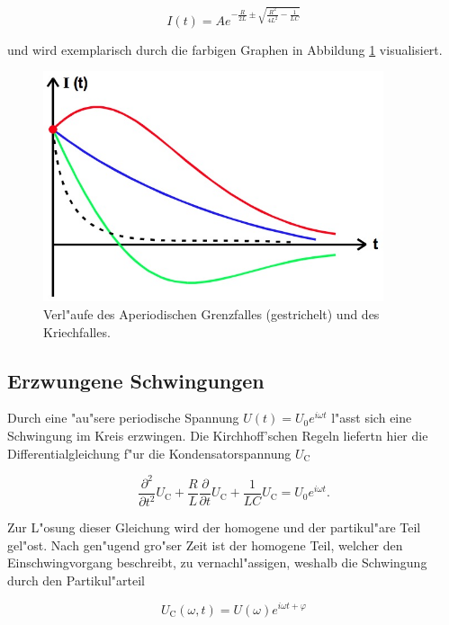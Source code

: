 		\begin{equation*}
			I(t) = Ae^{-\frac{R}{2L} \pm \sqrt{\frac{R^2}{4L^2} - \frac{1}{LC}}}
		\end{equation*}

		und wird exemplarisch durch die farbigen Graphen in Abbildung \ref{fig:aperiodischer_fall} visualisiert.

		\begin{figure}[h!]
			\centering
			\includegraphics[width = 10cm]{img/aperiodisch.JPG}
			\caption{Verl"aufe des Aperiodischen Grenzfalles (gestrichelt) und des Kriechfalles. \cite{anleitung}}
			\label{fig:aperiodischer_fall}
		\end{figure}

	\subsection{Erzwungene Schwingungen}

		Durch eine "au"sere periodische Spannung $U(t) = U_0 e^{i\omega t}$ l"asst sich eine Schwingung im Kreis erzwingen.
		Die Kirchhoff'schen Regeln liefertn hier die Differentialgleichung f"ur die Kondensatorspannung $U_\mathrm{C}$

		\begin{equation*}
			\frac{\partial^2}{\partial t^2} U_\mathrm{C} + \frac{R}{L} \frac{\partial}{\partial t} U_\mathrm{C} + \frac{1}{LC} U_\mathrm{C} = U_0 e^{i \omega t}.
		\end{equation*}

		Zur L"osung dieser Gleichung wird der homogene und der partikul"are Teil gel"ost.
		Nach gen"ugend gro"ser Zeit ist der homogene Teil, welcher den Einschwingvorgang beschreibt, zu vernachl"assigen, weshalb die Schwingung durch den Partikul"arteil

		\begin{equation*}
			U_\mathrm{C} (\omega, t) = U(\omega)e^{i \omega t + \varphi}
		\end{equation*}

